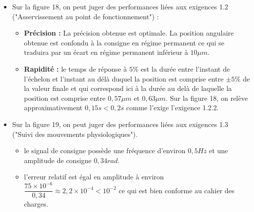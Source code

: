 \documentclass[10pt,fleqn]{article} %
\begin{document}
\begin{itemize}
\item Sur la figure 18, on peut juger des performances liées aux exigences 1.2 ("Asservissement au point de fonctionnement") :
\begin{itemize}
\item \textbf{Précision :} La précision obtenue est optimale. La position angulaire obtenue est confondu à la consigne en régime permanent ce qui se traduira par un écart en régime permanent inférieur à $10\mu m$.
\item \textbf{Rapidité : } le temps de réponse à $5\%$ est la durée entre l'instant de l'échelon et l'instant au délà duquel la position est comprise entre $\pm 5\%$ de la valeur finale et qui correspond ici à la durée au delà de laquelle la position est comprise entre $0,57\mu m$ et $0,63\mu m$. Sur la figure 18, on relève approximativement $0,15s<0,2s$ comme l'exige l'exigence 1.2.2.  
\end{itemize}
\item Sur la figure 19, on peut juger des performances liées aux exigences 1.3 ("Suivi des mouvements physiologiques"). 
\begin{itemize}
\item le signal de consigne possède une fréquence d'environ $0,5Hz$ et une amplitude de consigne $0,34rad$. 
\item l'erreur relatif est égal en amplitude à environ $\dfrac{75\times 10^{-6}}{0,34}\approx 2,2\times 10^{-4}<10^{-2}$ ce qui est bien conforme au cahier des charges.
\end{itemize}
\end{itemize}
\end{document}
